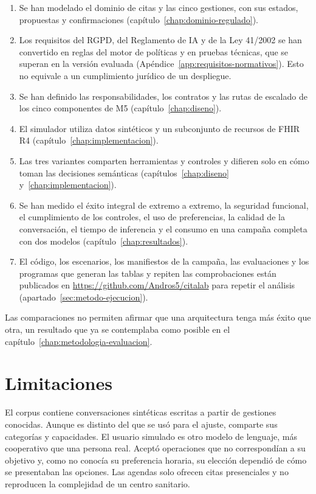 \begin{enumerate}
  \item Se han modelado el dominio de citas y las cinco gestiones, con sus
        estados, propuestas y confirmaciones
        (capítulo~\ref{chap:dominio-regulado}).
  \item Los requisitos del RGPD, del Reglamento de IA y de la Ley 41/2002 se
        han convertido en reglas del motor de políticas y en pruebas técnicas,
        que se superan en la versión evaluada
        (Apéndice~\ref{app:requisitos-normativos}). Esto no equivale a un
        cumplimiento jurídico de un despliegue.
  \item Se han definido las responsabilidades, los contratos y las rutas de
        escalado de los cinco componentes de M5
        (capítulo~\ref{chap:diseno}).
  \item El simulador utiliza datos sintéticos y un subconjunto de recursos de
        FHIR R4 (capítulo~\ref{chap:implementacion}).
  \item Las tres variantes comparten herramientas y controles y difieren solo
        en cómo toman las decisiones semánticas
        (capítulos~\ref{chap:diseno} y~\ref{chap:implementacion}).
  \item Se han medido el éxito integral de extremo a extremo, la seguridad
        funcional, el cumplimiento de los controles, el uso de preferencias, la
        calidad de la conversación, el tiempo de inferencia y el consumo en una
        campaña completa con dos modelos (capítulo~\ref{chap:resultados}).
  \item El código, los escenarios, los manifiestos de la campaña, las
        evaluaciones y los programas que generan las tablas y repiten las
        comprobaciones están publicados en
        \url{https://github.com/Andros5/citalab} para repetir el análisis
        (apartado~\ref{sec:metodo-ejecucion}).
\end{enumerate}

Las comparaciones no permiten afirmar que una arquitectura tenga más éxito que
otra, un resultado que ya se contemplaba como posible en el
capítulo~\ref{chap:metodologia-evaluacion}.

\section{Limitaciones}

El corpus contiene conversaciones sintéticas escritas a partir de gestiones
conocidas. Aunque es distinto del que se usó para el ajuste, comparte sus
categorías y capacidades. El usuario simulado es otro modelo de lenguaje, más
cooperativo que una persona real. Aceptó operaciones que no correspondían a su
objetivo y, como no conocía su preferencia horaria, su elección dependió de
cómo se presentaban las opciones. Las agendas solo ofrecen citas presenciales y
no reproducen la complejidad de un centro sanitario.

